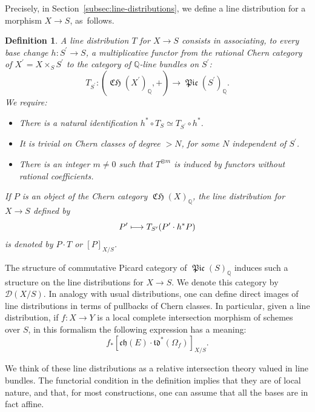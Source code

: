 \documentclass[11pt]{article}
\newcommand\mto{\mathchoice{\longmapsto}{\mapsto}{\mapsto}{\mapsto}}
\theoremstyle{plain}
\newtheorem*{definition-intro}{Definition}
\theoremstyle{definition}
\newcommand{\QBbb}{\mathbb Q}
\newcommand{\Dcal}{\mathcal D}
\newcommand{\chfrak}{\mathfrak {ch}}
\newcommand{\tdfrak}{\mathfrak {td}}
\DeclareMathOperator{\CHfrak}{\mathfrak{CH}}
\DeclareMathOperator{\Picfr}{\mathfrak{Pic}}
\begin{document}
Precisely, in Section~\ref{subsec:line-distributions}, we define a line distribution for a morphism $X\to S$, as~follows.

\begin{definition-intro}

A line distribution $T$ for $X\to S$ consists in associating, to every base change $h: S^{\prime}\to S$, a multiplicative functor from the rational Chern category of $X^{\prime}=X\times_{S}S^{\prime}$ to the category of $\QBbb$-line bundles on $S^{\prime}$:
\begin{displaymath}
T_{S^{\prime}} : (\CHfrak(X^{\prime})_\QBbb,+) \to \Picfr(S^{\prime})_{\QBbb}.
\end{displaymath}
We require:
\begin{itemize}
\item There is a natural identification $h^{\ast}\circ T_{S} \simeq T_{S^{\prime}}\circ h^{\ast}$.
\item It is trivial on Chern classes of degree $> N$, for some $N$ independent of $S^{\prime}$.
\item There is an integer $m\neq 0$ such that $T^{\otimes m}$ is induced by functors without rational coefficients.

\end{itemize}
If $P$ is an object of the Chern category $\CHfrak(X)_\QBbb$, the line distribution for $X\to S$ defined by
\begin{displaymath}
P^{\prime} \mto T_{S^{\prime}}(P^{\prime} \cdot h^\ast P)
\end{displaymath}
is denoted by $P\cdot T$ or $[P]_{X/S}$.
\end{definition-intro}

The structure of commutative Picard category of $\Picfr(S)_{\QBbb}$ induces such a structure on the line distributions for $X\to S$. We denote this category by $\Dcal(X/S)$. In analogy with usual distributions, one can define direct images of line distributions in terms of pullbacks of Chern classes. In particular, given a line distribution, if $f: X\to Y$ is a local complete intersection morphism of schemes over $S$, in this formalism the following expression has a meaning:
\begin{equation}\label{eq:introdirectimage}
f_\ast [\chfrak(E) \cdot \tdfrak^{\ast} (\Omega_f)]_{X/S}.
\end{equation}

We think of these line distributions as a relative intersection theory valued in line bundles. The functorial condition in the definition implies that they are of local nature, and that, for most constructions, one can assume that all the bases are in fact affine.
\end{document}
